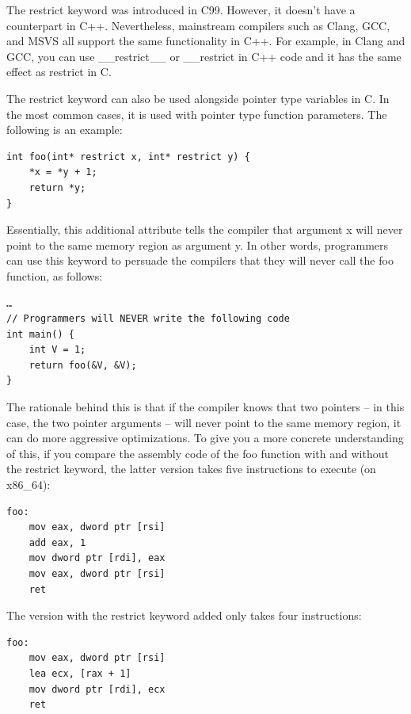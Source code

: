 \begin{tcolorbox}[colback=blue!5!white,colframe=blue!75!black, fonttitle=\bfseries,title=The restrict keyword in C and C++]	
\hspace*{0.7cm}The restrict keyword was introduced in C99. However, it doesn't have a counterpart in C++. Nevertheless, mainstream compilers such as Clang, GCC, and MSVS all support the same functionality in C++. For example, in Clang and GCC, you can use \_\_restrict\_\_ or \_\_restrict in C++ code and it has the same effect as restrict in C.
\end{tcolorbox}

The restrict keyword can also be used alongside pointer type variables in C. In the most common cases, it is used with pointer type function parameters. The following is an example:

\begin{lstlisting}[style=styleCXX]
int foo(int* restrict x, int* restrict y) {
	*x = *y + 1;
	return *y;
}
\end{lstlisting}

Essentially, this additional attribute tells the compiler that argument x will never point to the same memory region as argument y. In other words, programmers can use this keyword to persuade the compilers that they will never call the foo function, as follows:

\begin{lstlisting}[style=styleCXX]
…
// Programmers will NEVER write the following code
int main() {
	int V = 1;
	return foo(&V, &V);
}
\end{lstlisting}

The rationale behind this is that if the compiler knows that two pointers – in this case, the two pointer arguments – will never point to the same memory region, it can do more aggressive optimizations. To give you a more concrete understanding of this, if you compare the assembly code of the foo function with and without the restrict keyword, the latter version takes five instructions to execute (on x86\_64):

\begin{lstlisting}[style=stylePython]
foo:
	mov eax, dword ptr [rsi]
	add eax, 1
	mov dword ptr [rdi], eax
	mov eax, dword ptr [rsi]
	ret
\end{lstlisting}

The version with the restrict keyword added only takes four instructions:

\begin{lstlisting}[style=stylePython]
foo:
	mov eax, dword ptr [rsi]
	lea ecx, [rax + 1]
	mov dword ptr [rdi], ecx
	ret
\end{lstlisting}


